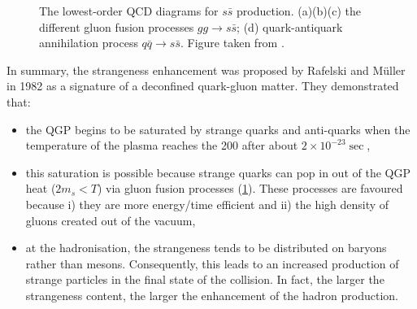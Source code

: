 \begin{figure}[h]
\begin{minipage}{0.33\textwidth}
	\end{minipage}\par\medskip
	\centering
	\begin{minipage}{0.33\textwidth}
	\end{minipage}%
	\caption{The lowest-order QCD diagrams for $s\bar{s}$ production. (a)(b)(c) the
	 different gluon fusion processes $gg\rightarrow s\bar{s}$; (d) quark-antiquark annihilation process $q\bar{q} \rightarrow s\bar{s}$. Figure taken from \cite{maireProductionBaryonsMultietranges2011}.}
	\label{fig:StrangenessEnhancement}
\end{figure}



In summary, the strangeness enhancement was proposed by Rafelski and M\"{u}ller in 1982 as a signature of a deconfined quark-gluon matter. They demonstrated that:
\begin{itemize}
\item the QGP begins to be saturated by strange quarks and anti-quarks when the temperature of the plasma reaches the 200 \mev after about $2 \times 10^{-23} \sec$,
\item this saturation is possible because strange quarks can pop in out of the QGP heat ($2 m_{s} < T$) via gluon fusion processes (\fig\ref{fig:StrangenessEnhancement}). These processes are favoured because i) they are more energy/time efficient and ii) the high density of gluons created out of the vacuum,
\item at the hadronisation, the strangeness tends to be distributed on baryons rather than mesons. Consequently, this leads to an increased production of strange particles in the final state of the collision. In fact, the larger the strangeness content, the larger the enhancement of the hadron production.\\
\end{itemize}

